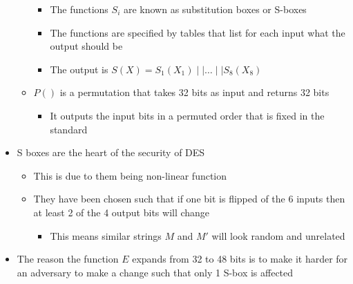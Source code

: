 \begin{itemize}
\begin{itemize}
\begin{itemize}
  		\item The functions $S_i$ are known as substitution boxes or S-boxes
  		\item The functions are specified by tables that list for each input what the output should be
  		\item The output is $S(X) = S_1(X_1) \mid \mid \dots \mid \mid S_8(X_8)$
    \end{itemize}
  	\item $P()$ is a permutation that takes 32 bits as input and returns 32 bits
    \begin{itemize}
  		\item It outputs the input bits in a permuted order that is fixed in the standard
    \end{itemize}
  \end{itemize}

  \item S boxes are the heart of the security of DES
  \begin{itemize}
  	\item This is due to them being non-linear function
  	\item They have been chosen such that if one bit is flipped of the 6 inputs then at least 2 of the 4 output bits will change
    \begin{itemize}
  		\item This means similar strings $M$ and $M'$ will look random and unrelated
    \end{itemize}
  \end{itemize}
  \item The reason the function $E$ expands from 32 to 48 bits is to make it harder for an adversary to make a change such that only 1 S-box is affected
\end{itemize}

